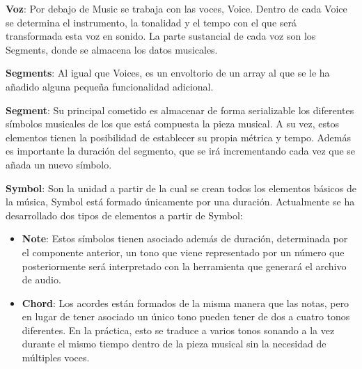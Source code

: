 \textbf{Voz}: Por debajo de Music se trabaja con las voces, Voice. Dentro de cada Voice se determina el instrumento, la tonalidad y el tempo con el que será transformada esta voz en sonido. La parte sustancial de cada voz son los Segments, donde se almacena los datos musicales.
\newline

\textbf{Segments}: Al igual que Voices, es un envoltorio de un array al que se le ha añadido alguna pequeña funcionalidad adicional.
\newline

\textbf{Segment}: Su principal cometido es almacenar de forma serializable los diferentes símbolos musicales de los que está compuesta la pieza musical. A su vez, estos elementos tienen la posibilidad de establecer su propia métrica y tempo. Además es importante la duración del segmento, que se irá incrementando cada vez que se añada un nuevo símbolo.
\newline

\textbf{Symbol}: Son la unidad a partir de la cual se crean todos los elementos básicos de la música, Symbol está formado únicamente por una duración. Actualmente se ha desarrollado dos tipos de elementos a partir de Symbol:
\begin{itemize}

	\item \textbf{Note}: Estos símbolos tienen asociado además de duración, determinada por el componente anterior, un tono que viene representado por un número que posteriormente será interpretado con la herramienta que generará el archivo de audio.

	\item \textbf{Chord}: Los acordes están formados de la misma manera que las notas, pero en lugar de tener asociado un único tono pueden tener de dos a cuatro tonos diferentes. En la práctica, esto se traduce a varios tonos sonando a la vez durante el mismo tiempo dentro de la pieza musical sin la necesidad de múltiples voces.

\end{itemize}
 
